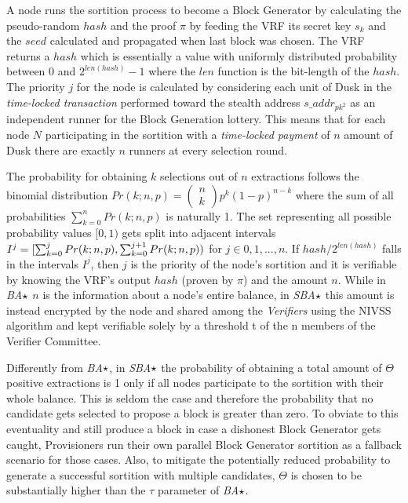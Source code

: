 A node runs the sortition process to become a Block Generator by
calculating the pseudo-random \(hash\) and the proof \(\pi\) by feeding
the VRF its secret key \(s_k\) and the \(seed\) calculated and
propagated when last block was chosen. The VRF returns a \(hash\) which
is essentially a value with uniformly distributed probability between 0
and \(2^{len(hash)} - 1\) where the \(len\) function is the bit-length
of the \(hash\). The priority \(j\) for the node is calculated by
considering each unit of \textrm{Dusk} in the \emph{time-locked transaction}
performed toward the stealth address \(s\_addr_{pk^2}\) as an
independent runner for the Block Generation lottery. This means that for
each node \(N\) participating in the sortition with a \emph{time-locked
payment} of \(n\) amount of \textrm{Dusk} there are exactly \(n\) runners at
every selection round.

The probability for obtaining \(k\) selections out of \(n\) extractions
follows the binomial distribution
\(Pr(k; n, p) = \left( \begin{array}{c} n \\ k \end{array} \right)p^k(1-p)^{n-k}\)
where the sum of all probabilities \(\sum_{k=0}^n Pr(k; n, p)\) is
naturally 1. The set representing all possible probability values
\([0, 1)\) gets split into adjacent intervals
\(I^j = [\space \sum_{k=0}^j Pr(k;n,p), \sum_{k=0}^{j+1} Pr(k;n,p)\space  )\)
for \(j \in {0, 1, ..., n}\). If \(hash/2^{len(hash)}\) falls in the
intervals \(I^j\), then \(j\) is the priority of the node's sortition
and it is verifiable by knowing the VRF's output \(hash\) (proven by
\(\pi\)) and the amount \(n\). While in \emph{BA}\(\large\star\) \(n\)
is the information about a node's entire balance, in
\emph{SBA}\(\large\star\) this amount is instead encrypted by the node
and shared among the \emph{Verifiers} using the NIVSS algorithm and kept
verifiable solely by a threshold t of the n members of the Verifier
Committee.

Differently from \emph{BA}\(\large\star\), in \emph{SBA}\(\large\star\)
the probability of obtaining a total amount of \(\Theta\) positive
extractions is 1 only if all nodes participate to the sortition with
their whole balance. This is seldom the case and therefore the
probability that no candidate gets selected to propose a block is greater
than zero. To obviate to this eventuality and still produce a block in
case a dishonest Block Generator gets caught, Provisioners run their own
parallel Block Generator sortition as a fallback scenario for those
cases. Also, to mitigate the potentially reduced probability to generate
a successful sortition with multiple candidates, \(\Theta\) is chosen to
be substantially higher than the \(\tau\) parameter of
\emph{BA}\(\large\star\).

